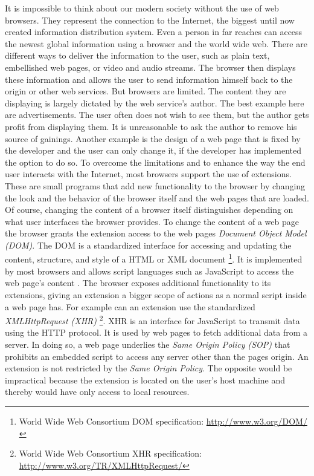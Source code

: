 \documentclass[article,colorback,accentcolor=tud9c,type=bsc]{tudthesis}
\begin{document}
	It is impossible to think about our modern society without the use of web browsers. They represent the connection to the Internet, the biggest until now created information distribution system. Even a person in far reaches can access the newest global information using a browser and the world wide web. There are different ways to deliver the information to the user, such as plain text, embellished web pages, or video and audio streams. The browser then displays these information and allows the user to send information himself back to the origin or other web services. But browsers are limited. The content they are displaying is largely dictated by the web service's author. The best example here are advertisements. The user often does not wish to see them, but the author gets profit from displaying them. It is unreasonable to ask the author to remove his source of gainings. Another example is the design of a web page that is fixed by the developer and the user can only change it, if the developer has implemented the option to do so. To overcome the limitations and to enhance the way the end user interacts with the Internet, most browsers support the use of extensions. These are small programs that add new functionality to the browser by changing the look and the behavior of the browser itself and the web pages that are loaded. Of course, changing the content of a browser itself distinguishes depending on what user interfaces the browser provides. To change the content of a web page the browser grants the extension access to the web pages \textit{Document Object Model (DOM)}. The DOM is a standardized interface for accessing and updating the content, structure, and style of a HTML or XML document \footnote{World Wide Web Consortium DOM specification: \url{http://www.w3.org/DOM/}}. It is implemented by most browsers and allows script languages such as JavaScript to access the web page's content \cite{domBrowserCompatibility}. The browser exposes additional functionality to its extensions, giving an extension a bigger scope of actions as a normal script inside a web page has. For example can an extension use the standardized \textit{XMLHttpRequest (XHR)} \footnote{World Wide Web Consortium XHR specification: \url{http://www.w3.org/TR/XMLHttpRequest/}}. XHR is an interface for JavaScript to transmit data using the HTTP protocol. It is used by web pages to fetch additional data from a server. In doing so, a web page underlies the \textit{Same Origin Policy (SOP)} that prohibits an embedded script to access any server other than the pages origin. An extension is not restricted by the \textit{Same Origin Policy}. The opposite would be impractical because the extension is located on the user's host machine and thereby would have only access to local resources. \\
\end{document}
